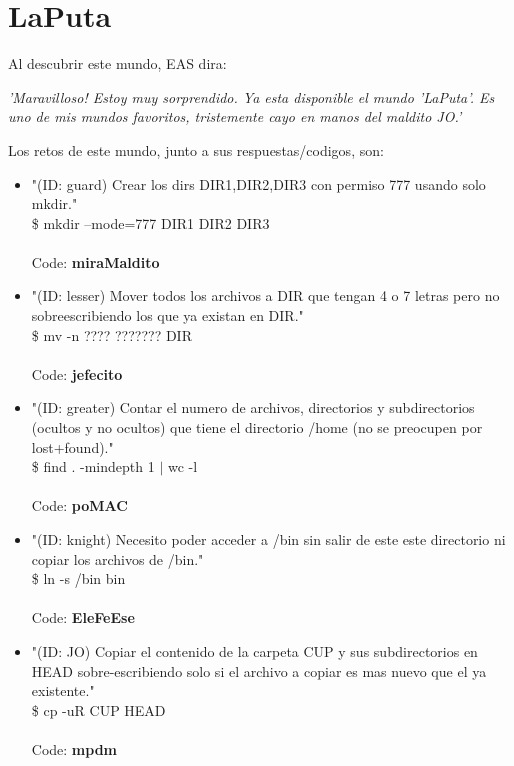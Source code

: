 \documentclass[a4paper,10pt]{article}
\begin{document}
	
\section{LaPuta}
	Al descubrir este mundo, EAS dira:
	
	\textit{'Maravilloso! Estoy muy sorprendido. Ya esta disponible el mundo 'LaPuta'. Es uno de mis mundos favoritos, tristemente cayo en manos del maldito JO.'\\}	
	
	Los retos de este mundo, junto a sus respuestas/codigos, son:
	
	\begin{itemize}
		\item "(ID: guard) Crear los dirs DIR1,DIR2,DIR3 con permiso 777 usando solo mkdir." \\ 
			\$ mkdir --mode=777 DIR1 DIR2 DIR3 \\ \\
			Code: \textbf{miraMaldito}
			
		\item "(ID: lesser) Mover todos los archivos a DIR que tengan 4 o 7 letras pero no sobreescribiendo los que ya existan en DIR."\\
			\$ mv -n ???? ??????? DIR \\ \\
			Code: \textbf{jefecito}
			
		\item "(ID: greater) Contar el numero de archivos, directorios y subdirectorios (ocultos y no ocultos) que tiene el directorio /home (no se preocupen por lost+found)."\\
			\$ find . -mindepth 1 $|$ wc -l \\ \\
			Code: \textbf{poMAC}
			
		\item "(ID: knight) Necesito poder acceder a /bin sin salir de este este directorio ni copiar los archivos de /bin."\\
			\$ ln -s /bin bin \\ \\
			Code: \textbf{EleFeEse}
			
		\item "(ID: JO) Copiar el contenido de la carpeta CUP y sus subdirectorios en HEAD sobre-escribiendo solo si el archivo a copiar es mas nuevo que el ya existente."\\
			\$ cp -uR CUP HEAD \\ \\
			Code: \textbf{mpdm}
	\end{itemize}
\end{document}
